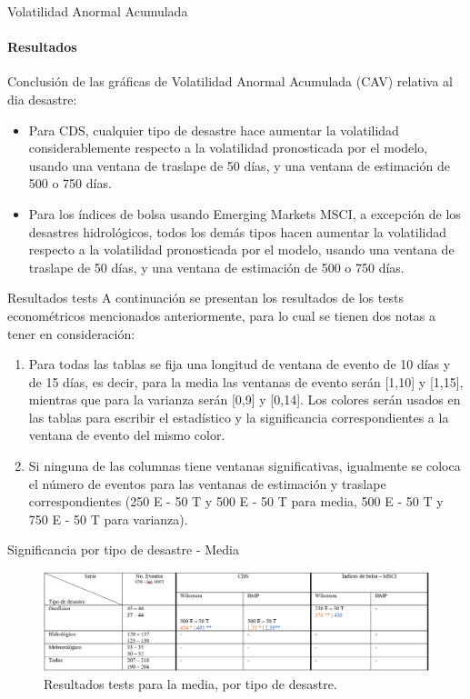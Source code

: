 \documentclass{beamer}
\begin{document}
\begin{frame}{Volatilidad Anormal Acumulada}
\framesubtitle{Resultados}
Conclusión de las gráficas de Volatilidad Anormal Acumulada (CAV) relativa al dia desastre:
\begin{itemize}
    \item Para CDS, cualquier tipo de desastre hace aumentar la volatilidad considerablemente respecto a la volatilidad pronosticada por el modelo, usando una ventana de traslape de 50 días, y una ventana de estimación de 500 o 750 días.
    \item Para los índices de bolsa usando Emerging Markets MSCI, a excepción de los desastres hidrológicos, todos los demás tipos hacen aumentar la volatilidad respecto a la volatilidad pronosticada por el modelo, usando una ventana de traslape de 50 días, y una ventana de estimación de 500 o 750 días.
\end{itemize}
\end{frame}

\begin{frame}{Resultados tests}
 A continuación se presentan los resultados de los tests econométricos mencionados anteriormente, para lo cual se tienen dos notas a tener en consideración:
 \begin{enumerate}
    \item Para todas las tablas se fija una longitud de ventana de evento de 10 días y de 15 días, es decir, para la media las ventanas de evento serán {\color{orangebracket} [1,10]} y {\color{bluecomma} [1,15]}, mientras que para la varianza serán {\color{orangebracket} [0,9]} y {\color{bluecomma} [0,14]}. Los colores serán usados en las tablas para escribir el estadístico y la significancia correspondientes a la ventana de evento del mismo color.
    \item Si ninguna de las columnas tiene ventanas significativas, igualmente se coloca el número de eventos para las ventanas de estimación y traslape correspondientes (250 E - 50 T y 500 E - 50 T para media, 500 E - 50 T y 750 E - 50 T para varianza).
 \end{enumerate}
\end{frame}

\begin{frame}{Significancia por tipo de desastre - Media}
    \begin{figure}
        \includegraphics[width=\linewidth]{../Graficos_Paper/Tablas/Desastre_Media.png}
        \caption{Resultados tests para la media, por tipo de desastre.}
    \end{figure}
\end{frame}
\end{document}
